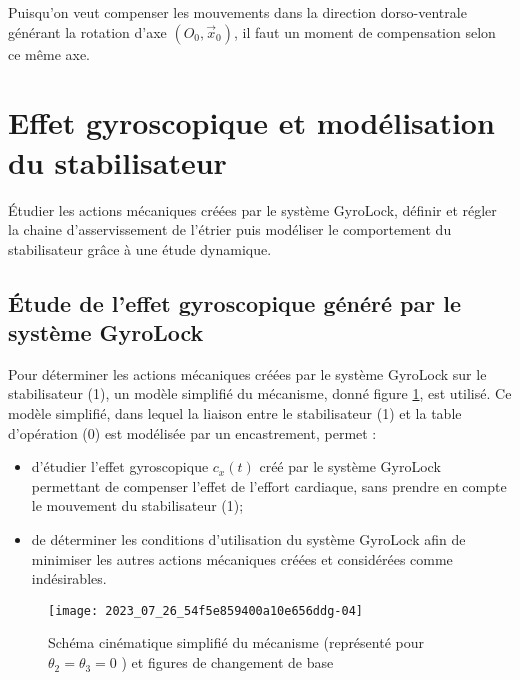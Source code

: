 \ifprof
\begin{corrige}
Puisqu'on veut compenser les mouvements dans la direction dorso-ventrale générant la rotation d'axe $\left( O_0,\overrightarrow{x}_0 \right)$, il faut un moment de compensation selon ce même axe.
\end{corrige}
\else
\fi

\section{Effet gyroscopique et modélisation du stabilisateur}

\begin{obj}
Étudier les actions mécaniques créées par le système GyroLock, définir et régler la chaine d'asservissement de l'étrier puis modéliser le comportement du stabilisateur grâce à une étude dynamique.
\end{obj}
\ifprof
\else
\subsection{\label{sec:IIA} Étude de l'effet gyroscopique généré par le système GyroLock}
Pour déterminer les actions mécaniques créées par le système GyroLock sur le stabilisateur (1), un modèle simplifié du mécanisme, donné figure \ref{fig_ccspsi2022:06}, est utilisé. Ce modèle simplifié, dans lequel la liaison entre le stabilisateur (1) et la table d'opération (0) est modélisée par un encastrement, permet :

\begin{itemize}
  \item d'étudier l'effet gyroscopique $c_{x}(t)$ créé par le système GyroLock permettant de compenser l'effet de l'effort cardiaque, sans prendre en compte le mouvement du stabilisateur (1);

  \item de déterminer les conditions d'utilisation du système GyroLock afin de minimiser les autres actions mécaniques créées et considérées comme indésirables.
\end{itemize}


\begin{figure}[!h]
\centering
\texttt{[image: 2023\_07\_26\_54f5e859400a10e656ddg-04]}
\caption{\label{fig_ccspsi2022:06}Schéma cinématique simplifié du mécanisme (représenté pour $\theta_{2}=\theta_{3}=0$ ) et figures de changement de base}
\end{figure}

